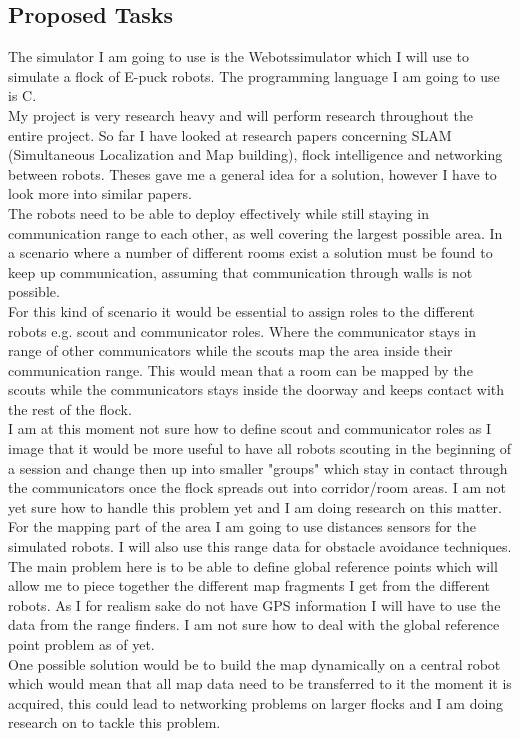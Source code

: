 \documentclass[10pt,a4paper]{article}
\begin{document}
\begin{flushleft}
\section{Proposed Tasks}
The simulator I am going to use is the Webots\texttrademark simulator which I will use to simulate a flock of E-puck robots. The programming language I am going to use is C. \\
My project is very research heavy and will perform research throughout the entire project. So far I have looked at research papers concerning SLAM (Simultaneous Localization and Map building)\cite{citeulike:8530320}, flock intelligence\cite{citeulike:130355} and networking between robots\cite{citeulike:4509551}. Theses gave me a general idea for a solution, however I have to look more into similar papers. \\[3ex]

The robots need to be able to deploy effectively while still staying in communication range to each other, as well covering the largest possible area. In a scenario where a number of different rooms exist a solution must be found to keep up communication, assuming that communication through walls is not possible. \\ 
For this kind of scenario it would be essential to assign roles to the different robots e.g. scout and communicator roles. Where the communicator stays in range of other communicators while the scouts map the area inside their communication range. This would mean that a room can be mapped by the scouts while the communicators stays inside the doorway and keeps contact with the rest of the flock.\\
I am at this moment not sure how to define scout and communicator roles as I image that it would be more useful to have all robots scouting in the beginning of a session and change then up into smaller "groups" which stay in contact through the communicators once the flock spreads out into corridor/room areas. I am not yet sure how to handle this problem yet and I am doing research on this matter.\\[3ex]

For the mapping part of the area I am going to use distances sensors for the simulated robots. I will also use this range data for obstacle avoidance techniques. The main problem here is to be able to define global reference points which will allow me to piece together the different map fragments I get from the different robots. As I for realism sake  do not have GPS information I will have to use the data from the range finders. I am not sure how to deal with the global reference point problem as of yet.\\
One possible solution would be to build the map dynamically on a central robot which would mean that all map data need to be transferred to it the moment it is acquired, this could lead to networking problems on larger flocks and I am doing research on to tackle this problem.\\[3ex]


\end{flushleft}
\end{document}
